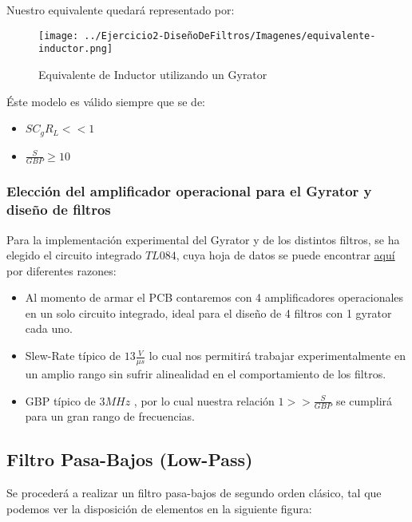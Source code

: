 Nuestro equivalente quedará representado por:

\begin{figure}[H]
    \centering
    \texttt{[image: ../Ejercicio2-DiseñoDeFiltros/Imagenes/equivalente-inductor.png]}
    \caption{Equivalente de Inductor utilizando un Gyrator}
\end{figure}

Éste modelo es válido siempre que se de:

\begin{itemize}
	\item $SC_gR_L << 1$
	\item $\frac{S}{GBP} \geq 10$
\end{itemize}


\subsubsection{Elección del amplificador operacional para el Gyrator y diseño de filtros}

Para la implementación experimental del Gyrator y de los distintos filtros, 
se ha elegido el circuito integrado $TL084$, cuya hoja de datos se puede encontrar \href{https://www.ti.com/lit/ds/symlink/tl084.pdf?ts=1602260789397&ref_url=https%253A%252F%252Fwww.ti.com%252Fproduct%252FTL084}{aquí} por diferentes razones:

\begin{itemize}
	\item Al momento de armar el PCB contaremos con 4 amplificadores operacionales en un solo circuito integrado, ideal para el diseño de 4 filtros con 1 gyrator cada uno. 
	\item Slew-Rate típico de $13 \frac{V}{\mu s}$ lo cual nos permitirá trabajar experimentalmente en un amplio rango sin sufrir alinealidad en el comportamiento de los filtros.
	\item GBP típico de $3MHz$ , por lo cual nuestra relación $1 >> \frac{S}{GBP}$ se cumplirá para un gran rango de frecuencias.
\end{itemize}

\subsection{Filtro Pasa-Bajos (Low-Pass)}

Se procederá a realizar un filtro pasa-bajos de segundo orden clásico, tal que podemos
ver la disposición de elementos en la siguiente figura:

